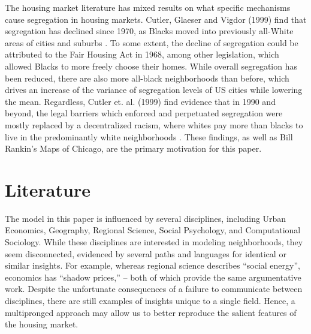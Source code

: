 \documentclass[11pt]{asaproc}
\newcommand{\1}{\mathbb{1}}
\begin{document}
The housing market literature has mixed results on what specific mechanisms cause segregation in housing markets. Cutler, Glaeser and Vigdor (1999) find that segregation has declined since 1970, as Blacks moved into previously all-White areas of cities and suburbs \citep{cutler99}. To some extent, the decline of segregation could be attributed to the Fair Housing Act in 1968, among other legislation, which allowed Blacks to more freely choose their homes. While overall segregation has been reduced, there are also more all-black neighborhoods than before, which drives an increase of the variance of segregation levels of US cities while lowering the mean. Regardless, Cutler et. al. (1999)  find evidence that in 1990 and beyond, the legal barriers which enforced and perpetuated segregation were mostly replaced by a decentralized racism, where whites pay more than blacks to live in the predominantly white neighborhoods \citep{cutler99}. These findings, as well as Bill Rankin's Maps of Chicago, are the primary motivation for this paper.

\section{Literature}

The model in this paper is influenced by several disciplines, including Urban Economics, Geography, Regional Science, Social Psychology, and Computational Sociology. While these disciplines are interested in modeling neighborhoods, they seem disconnected, evidenced by several paths and languages for identical or similar insights. For example, whereas regional science describes ``social energy''\citep{isard72}, economics has ``shadow prices,'' -- both of which provide the same argumentative work. Despite the unfortunate consequences of a failure to communicate between disciplines, there are still examples of insights unique to a single field. Hence, a multipronged approach may allow us to better reproduce the salient features of the housing market.
\end{document}
